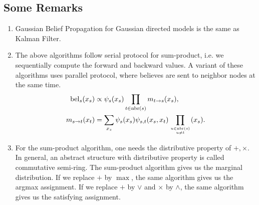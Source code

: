 \documentclass{article}
\begin{document}
\subsection{Some Remarks}
\begin{enumerate}
\item Gaussian Belief Propagation for Gaussian directed models is the same as Kalman Filter. 
\item The above algorithms follow serial protocol for sum-product, i.e. we sequentially compute the forward and backward values. A variant of these algorithms uses parallel protocol, where believes are sent to neighbor nodes at the same time.
\begin{align*}
{\rm bel}_s(x_s)&\propto \psi_s(x_s)\prod_{t\in {\rm nbr}(s)}m_{t\rightarrow s}(x_s),\\
m_{s\rightarrow t}(x_t)&=\sum_{x_s}\psi_s(x_s)\psi_{s,t}(x_s,x_t)\prod_{u\in {\rm nbr}(s)\atop u\neq t}(x_s).
\end{align*} 
\item For the sum-product algorithm, one needs the distributive property of $+,\times$. In general, an abstract structure with distributive property is called commutative semi-ring. The sum-product algorithm gives us the marginal distribution. If we replace $+$ by $\max$, the same algorithm gives us the argmax assignment. If we replace $+$ by $\vee$ and $\times$ by $\wedge$, the same algorithm gives us the satisfying assignment.  

\end{enumerate}
\end{document}
